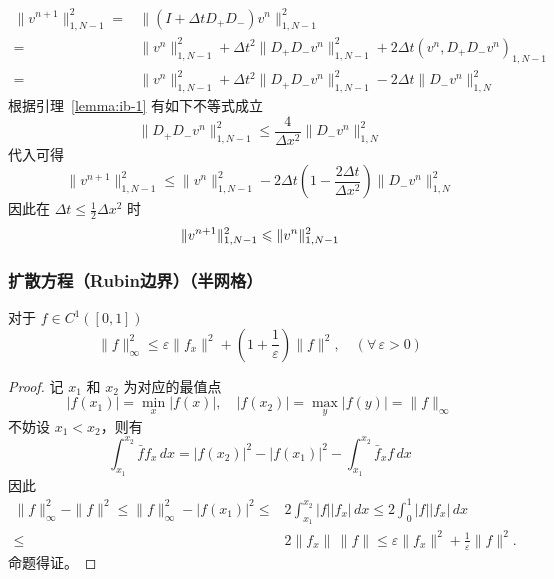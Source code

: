 \begin{solution*}
    \begin{align*}
        \| v^{n+1} \|_{1,N-1}^2
        ={} & \|(I + \Delta t D_+D_-) v^n\|_{1,N-1}^2                     \\
        ={} & \| v^n \|_{1,N-1}^2 + \Delta t^2 \| D_+ D_- v^n\|_{1,N-1}^2
        + 2 \Delta t \left( v^n, D_+ D_- v^n \right)_{1,N-1}
        \\
        ={} & \| v^n \|_{1,N-1}^2 + \Delta t^2 \| D_+ D_- v^n\|_{1,N-1}^2
        - 2 \Delta t \| D_- v^n\|_{1,N}^2
    \end{align*}
    根据引理~\ref{lemma:ib-1} 有如下不等式成立
    \[
        \| D_+ D_- v^n\|_{1,N-1}^2 \le \frac{4}{\Delta x^2} \| D_- v^n \|_{1,N}^2
    \]
    代入可得
    \[
        \| v^{n+1} \|_{1,N-1}^2 \le \| v^{n} \|_{1,N-1}^2
        - 2\Delta t \left( 1 - \frac{2\Delta t}{\Delta x^2} \right) \| D_- v^n \|_{1,N}^2
    \]
    因此在 $\Delta t \le \frac12 \Delta x^2$ 时
    \[
        \| v^{n+1} \|_{1,N-1}^2 \le \| v^{n} \|_{1,N-1}^2 \qedhere
    \]
\end{solution*}

\subsubsection{扩散方程（Rubin边界）（半网格）}

\begin{lemma}\label{lemma:ib-2}
    对于 $f \in C^1([0,1])$
    \[
        \|f\|_{\infty}^2 \le \varepsilon \|f_x\|^2 + (1 + \frac{1}{\varepsilon}) \|f\|^2,\quad (\forall\,\varepsilon > 0)
    \]
\end{lemma}

\begin{proof}
    记 $x_1$ 和 $x_2$ 为对应的最值点
    \[
        |f(x_1)| = \min_x |f(x)|,\quad |f(x_2)| = \max_y |f(y)| = \|f\|_{\infty}
    \]
    不妨设 $x_1 < x_2$，则有
    \[
        \int_{x_1}^{x_2} \bar{f} f_x\,dx = |f(x_2)|^2 - |f(x_1)|^2 - \int_{x_1}^{x_2} \bar{f}_x f\,dx
    \]
    因此
    \begin{align*}
        \|f\|_{\infty}^2 - \|f\|^2 \le{}
        \|f\|_{\infty}^2 - |f(x_1)|^2 \le{} & 2 \int_{x_1}^{x_2} |f| |f_x|\,dx
        \le{} 2 \int_0^1 |f| |f_x|\,dx                                         \\
        \le{}                               & 2 \|f_x\|\, \|f\|
        \le \varepsilon \| f_x \|^2 + \frac{1}{\varepsilon} \|f\|^2.
    \end{align*}
    命题得证。
\end{proof}


